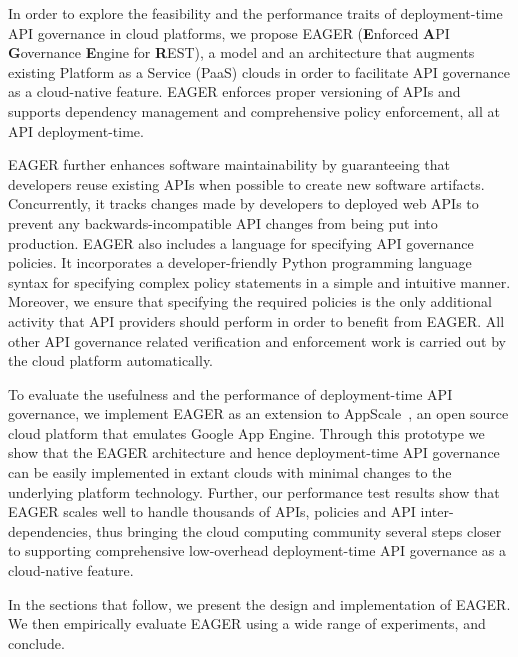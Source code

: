 In order to explore the feasibility and the performance traits of deployment-time
API governance in cloud platforms,
we propose EAGER ({\bf E}nforced {\bf A}PI {\bf G}overnance
{\bf E}ngine for {\bf R}EST), a model and an architecture that augments existing
Platform as a Service (PaaS) clouds in order to facilitate API governance as a 
cloud-native feature. EAGER enforces proper versioning of APIs and supports dependency 
management and comprehensive policy enforcement, all at API deployment-time.

EAGER further enhances software maintainability by guaranteeing that 
developers reuse existing APIs when possible to create new software artifacts. 
Concurrently, it
tracks changes made by developers to deployed web APIs to prevent
any backwards-incompatible API changes from being put into production.
EAGER also includes a language for specifying 
API governance policies.  It incorporates a developer-friendly 
Python programming language syntax for 
specifying complex policy statements in a simple and 
intuitive manner. Moreover, we ensure that specifying the required policies 
is the only additional activity that API providers should perform in
order to benefit from EAGER. All other API governance related verification and 
enforcement work is carried out by the cloud platform automatically.

To evaluate the usefulness and the performance of deployment-time API governance, 
we implement EAGER as an extension to AppScale~\cite{appscale13}, 
an open source cloud platform that emulates Google App Engine. Through this
prototype we show that the EAGER 
architecture and hence deployment-time API governance can be easily implemented 
in extant clouds with minimal changes to the underlying platform technology. Further,
our performance test results show that EAGER scales well to handle thousands of APIs,
policies and API inter-dependencies, thus bringing the cloud computing community several
steps closer to supporting comprehensive low-overhead deployment-time API governance
as a cloud-native feature.

In the sections that follow, we present the design and implementation of
EAGER. We then empirically evaluate EAGER using a wide range of
experiments, and conclude.
